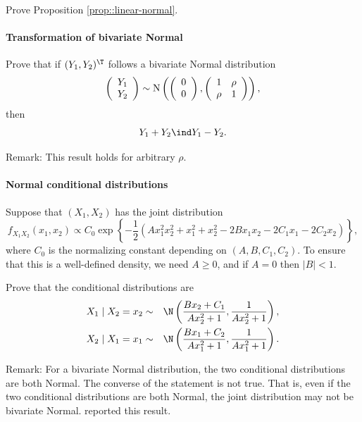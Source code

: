Prove Proposition \ref{prop::linear-normal}. 





\paragraph{Transformation of bivariate Normal}


Prove that if $(Y_{1},Y_{2})^{\T}$ follows
a bivariate Normal distribution
\[
\left(\begin{array}{c}
Y_{1}\\
Y_{2}
\end{array}\right)\sim\textup{N}\left(\left(\begin{array}{c}
0\\
0
\end{array}\right),\left(\begin{array}{cc}
1 & \rho\\
\rho & 1
\end{array}\right)\right),
\]
then 
$$
Y_{1}+Y_{2}\ind Y_{1}-Y_{2}.
$$



Remark: This result holds for arbitrary $\rho$. 


\paragraph{Normal conditional distributions}\label{hwmath2::normal-conditionals}


Suppose that $(X_1, X_2)$ has the joint distribution
$$
f_{X_1X_2}\left(x_{1}, x_{2}\right) \propto C_0 \exp \left\{  -\frac{1}{2}\left( A x_{1}^{2} x_{2}^{2}+x_{1}^{2}+x_{2}^{2} -2 B x_{1} x_{2}-2 C_{1} x_{1}-2 C_{2} x_{2} \right) \right\},
$$
where $C_0$ is the normalizing constant depending on $(A,B,C_1, C_2)$. To ensure that this is a well-defined density, we need $A \geq 0$, and if $A=0$ then $|B| < 1$. 

Prove that the conditional distributions are
\begin{eqnarray*}
X_{1} \mid X_2 =  x_{2}  &\sim& \N\left(\frac{B x_{2}+C_{1}}{A x_{2}^{2}+1}, \frac{1}{A x_{2}^{2}+1}\right) , \\
X_{2} \mid X_1 =  x_{1}  &\sim& \N\left(\frac{B x_{1}+C_{2}}{A x_{1}^{2}+1}, \frac{1}{A x_{1}^{2}+1}\right).
\end{eqnarray*}


Remark: 
For a bivariate Normal distribution, the two conditional distributions are both Normal. The converse of the statement is not true. That is, even if the two conditional distributions are both Normal, the joint distribution may not be bivariate Normal. 
\citet{gelman1991note} reported this result. 



